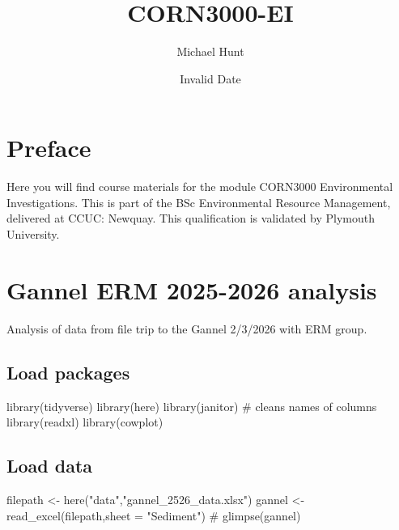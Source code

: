 \documentclass[
  letterpaper,
  DIV=11,
  numbers=noendperiod]{scrreprt}
\title{CORN3000-EI}
\author{Michael Hunt}
\date{Invalid Date}
\newenvironment{Shaded}{\begin{snugshade}}{\end{snugshade}}
\newcommand{\AttributeTok}[1]{\textcolor[rgb]{0.40,0.45,0.13}{#1}}
\newcommand{\CommentTok}[1]{\textcolor[rgb]{0.37,0.37,0.37}{#1}}
\newcommand{\FunctionTok}[1]{\textcolor[rgb]{0.28,0.35,0.67}{#1}}
\newcommand{\NormalTok}[1]{\textcolor[rgb]{0.00,0.23,0.31}{#1}}
\newcommand{\OtherTok}[1]{\textcolor[rgb]{0.00,0.23,0.31}{#1}}
\newcommand{\StringTok}[1]{\textcolor[rgb]{0.13,0.47,0.30}{#1}}
\renewcommand*\contentsname{Table of contents}
\newcommand\contentsname{Table of contents}
\begin{document}
\maketitle

\renewcommand*\contentsname{Table of contents}
{
\hypersetup{linkcolor=}
\setcounter{tocdepth}{2}
\tableofcontents
}


\chapter*{Preface}\label{preface}


Here you will find course materials for the module CORN3000
Environmental Investigations. This is part of the BSc Environmental
Resource Management, delivered at CCUC: Newquay. This qualification is
validated by Plymouth University.


\chapter{Gannel ERM 2025-2026
analysis}\label{gannel-erm-2025-2026-analysis}

Analysis of data from file trip to the Gannel 2/3/2026 with ERM group.

\section{Load packages}\label{load-packages}

\begin{Shaded}
\begin{Highlighting}[]
\FunctionTok{library}\NormalTok{(tidyverse)}
\FunctionTok{library}\NormalTok{(here)}
\FunctionTok{library}\NormalTok{(janitor) }\CommentTok{\# cleans names of columns}
\FunctionTok{library}\NormalTok{(readxl)}
\FunctionTok{library}\NormalTok{(cowplot)}
\end{Highlighting}
\end{Shaded}

\section{Load data}\label{load-data}

\begin{Shaded}
\begin{Highlighting}[]
\NormalTok{filepath }\OtherTok{\textless{}{-}} \FunctionTok{here}\NormalTok{(}\StringTok{"data"}\NormalTok{,}\StringTok{"gannel\_2526\_data.xlsx"}\NormalTok{)}
\NormalTok{gannel }\OtherTok{\textless{}{-}} \FunctionTok{read\_excel}\NormalTok{(filepath,}\AttributeTok{sheet =} \StringTok{"Sediment"}\NormalTok{)}
\CommentTok{\# glimpse(gannel)}
\end{Highlighting}
\end{Shaded}
\end{document}
